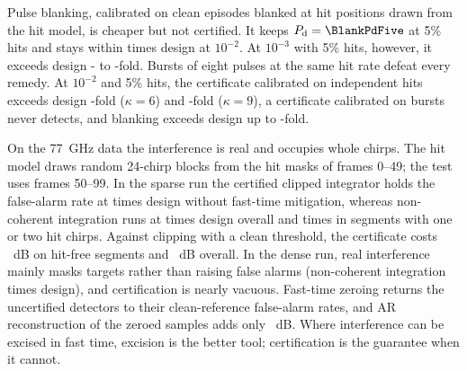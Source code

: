 \documentclass[journal]{IEEEtran}
\begin{document}
Pulse blanking, calibrated on clean episodes blanked at hit positions drawn from the hit model, is cheaper but not certified. It keeps $P_{\rm d}=\BlankPdFive$ at 5\% hits and stays within \BlankPfaMax{} times design at $10^{-2}$. At $10^{-3}$ with 5\% hits, however, it exceeds design \BlankFiveThreeMin- to \BlankFiveThreeMax-fold. Bursts of eight pulses at the same hit rate defeat every remedy. At $10^{-2}$ and 5\% hits, the certificate calibrated on independent hits exceeds design \CertBurstFiveSix-fold ($\kappa=6$) and \CertBurstFiveNine-fold ($\kappa=9$), a certificate calibrated on bursts never detects, and blanking exceeds design up to \BlankBurstMax-fold.

On the 77~GHz data the interference is real and occupies whole chirps. The hit model draws random 24-chirp blocks from the hit masks of frames 0--49; the test uses frames 50--99. In the sparse run the certified clipped integrator holds the false-alarm rate at \JCertPfaC{} times design without fast-time mitigation, whereas non-coherent integration runs at \JDinPfaC{} times design overall and \JDinPfaCone{} times in segments with one or two hit chirps. Against clipping with a clean threshold, the certificate costs \JCertCostClean~dB on hit-free segments and \JCertCostAll~dB overall. In the dense run, real interference mainly masks targets rather than raising false alarms (non-coherent integration \JDinPfaA{} times design), and certification is nearly vacuous. Fast-time zeroing returns the uncertified detectors to their clean-reference false-alarm rates, and AR reconstruction of the zeroed samples adds only \JZarGainA~dB. Where interference can be excised in fast time, excision is the better tool; certification is the guarantee when it cannot.
\end{document}
